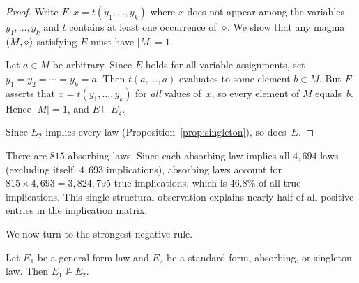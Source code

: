 \begin{proof}
Write $E \colon x = t(y_1, \ldots, y_k)$ where $x$ does not appear among the
variables $y_1, \ldots, y_k$ and $t$ contains at least one occurrence of~$\diamond$.
We show that any magma $(M, \diamond)$ satisfying $E$ must have $|M| = 1$.

Let $a \in M$ be arbitrary.  Since $E$ holds for all variable assignments, set
$y_1 = y_2 = \cdots = y_k = a$.  Then $t(a, \ldots, a)$ evaluates to some
element $b \in M$.  But $E$ asserts that $x = t(y_1, \ldots, y_k)$ for
\emph{all} values of~$x$, so every element of $M$ equals~$b$.  Hence
$|M| = 1$, and $E \models E_2$.

Since $E_2$ implies every law (Proposition~\ref{prop:singleton}), so does~$E$.
\end{proof}

\begin{remark}\label{rem:absorbing-count}
There are $815$ absorbing laws.  Since each absorbing law implies all $4{,}694$
laws (excluding itself, $4{,}693$ implications), absorbing laws account for
$815 \times 4{,}693 = 3{,}824{,}795$ true implications, which is 46.8\% of all
true implications.  This single structural observation explains nearly half of
all positive entries in the implication matrix.
\end{remark}

We now turn to the strongest negative rule.

\begin{theorem}\label{thm:general-nonimplication}
Let $E_1$ be a general-form law and $E_2$ be a standard-form, absorbing, or
singleton law.  Then $E_1 \not\models E_2$.
\end{theorem}

